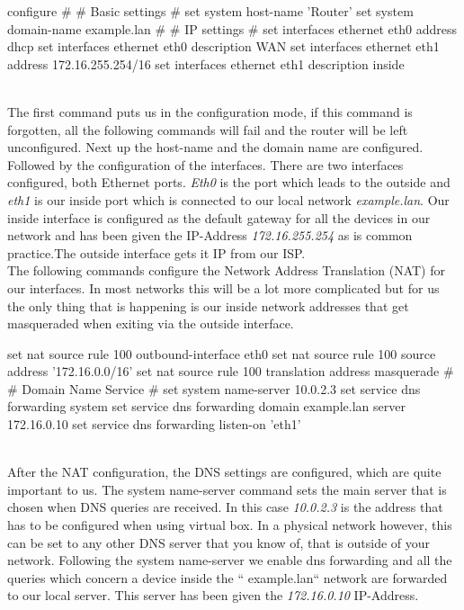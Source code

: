 \begin{cisco}[title=Basic configuration]
configure
#
# Basic settings
#
set system host-name 'Router'
set system domain-name example.lan
#
# IP settings
#
set interfaces ethernet eth0 address dhcp
set interfaces ethernet eth0 description WAN
set interfaces ethernet eth1 address 172.16.255.254/16
set interfaces ethernet eth1 description inside
\end{cisco} \\
The first command puts us in the configuration mode, if this command is forgotten, all the following commands will fail and the router will be left unconfigured. Next up the host-name and the domain name are configured. Followed by the configuration of the interfaces. There are two interfaces configured, both Ethernet ports. \textit{Eth0} is the port which leads to the outside and \textit{eth1} is our inside port which is connected to our local network \textit{example.lan}. Our inside interface is configured as the default gateway for all the devices in our network and has been given the IP-Address \textit{172.16.255.254} as is common practice.The outside interface gets it IP from our ISP.\\
The following commands configure the Network Address Translation (NAT) for our interfaces. In most networks this will be a lot more complicated but for us the only thing that is happening is our inside network addresses that get masqueraded when exiting via the outside interface.
\begin{cisco}[title=NAT configuration]
set nat source rule 100 outbound-interface eth0
set nat source rule 100 source address '172.16.0.0/16'
set nat source rule 100 translation address masquerade
#
# Domain Name Service
#
set system name-server 10.0.2.3
set service dns forwarding system
set service dns forwarding domain example.lan server 172.16.0.10
set service dns forwarding listen-on 'eth1'
\end{cisco}\\
After the NAT configuration, the DNS settings are configured, which are quite important to us. The system name-server command sets the main server that is chosen when DNS queries are received. In this case \textit{10.0.2.3} is the address that has to be configured when using virtual box. In a physical network however, this can be set to any other DNS server that you know of, that is outside of your network. Following the system name-server we enable dns forwarding and all the queries which concern a device inside the `` example.lan`` network are forwarded to our local server. This server has been given the \textit{172.16.0.10} IP-Address.















